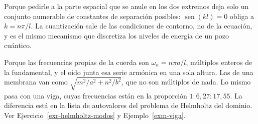 \documentclass[
  spanish,
  a4paper,
]{scrbook}
\theoremstyle{definition}
\theoremstyle{plain}
\theoremstyle{definition}
\theoremstyle{plain}
\theoremstyle{definition}
\theoremstyle{remark}
\begin{document}
\begin{tcolorbox}[enhanced jigsaw, arc=.35mm, bottomrule=.15mm, bottomtitle=1mm, breakable, colback=white, colbacktitle=quarto-callout-tip-color!10!white, colframe=quarto-callout-tip-color-frame, coltitle=black, left=2mm, leftrule=.75mm, opacityback=0, opacitybacktitle=0.6, rightrule=.15mm, title=\textcolor{quarto-callout-tip-color}{\faLightbulb}\hspace{0.5em}{23. ¿Por qué las frecuencias son discretas?}, titlerule=0mm, toprule=.15mm, toptitle=1mm]

Porque pedirle a la parte espacial que se anule en los dos extremos deja
solo un conjunto numerable de constantes de separación posibles:
\(\operatorname{sen}(kl)=0\) obliga a \(k = n\pi/l\). La cuantización
sale de las condiciones de contorno, no de la ecuación, y es el mismo
mecanismo que discretiza los niveles de energía de un pozo cuántico.

\end{tcolorbox}

\begin{tcolorbox}[enhanced jigsaw, arc=.35mm, bottomrule=.15mm, bottomtitle=1mm, breakable, colback=white, colbacktitle=quarto-callout-tip-color!10!white, colframe=quarto-callout-tip-color-frame, coltitle=black, left=2mm, leftrule=.75mm, opacityback=0, opacitybacktitle=0.6, rightrule=.15mm, title=\textcolor{quarto-callout-tip-color}{\faLightbulb}\hspace{0.5em}{24. ¿Por qué una guitarra tiene una nota definida y un tambor no?}, titlerule=0mm, toprule=.15mm, toptitle=1mm]

Porque las frecuencias propias de la cuerda son \(\omega_n = n\pi a/l\),
múltiplos enteros de la fundamental, y el oído junta esa serie armónica
en una sola altura. Las de una membrana van como
\(\sqrt{m^2/a^2+n^2/b^2}\), que no son múltiplos de nada. Lo mismo pasa
con una viga, cuyas frecuencias están en la proporción
\(1:6{,}27:17{,}55\). La diferencia está en la lista de autovalores del
problema de Helmholtz del dominio. Ver
Ejercicio~\ref{exr-helmholtz-modos} y Ejemplo~\ref{exm-viga}.

\end{tcolorbox}
\end{document}
